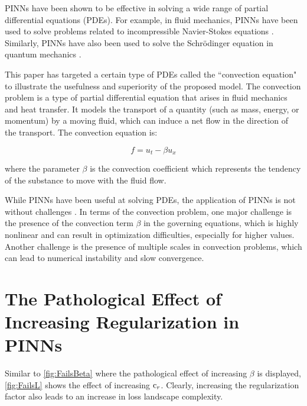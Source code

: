 \documentclass[letterpaper]{article} %
\begin{document}
        PINNs have been shown to be effective in solving a wide range of partial differential equations (PDEs). For example, in fluid mechanics, PINNs have been used to solve problems related to incompressible Navier-Stokes equations \cite{JIN2021109951}. Similarly, PINNs have also been used to solve the Schrödinger equation in quantum mechanics \cite{li2022mix}.

        This paper has targeted a certain type of PDEs called the ``convection equation" to illustrate the usefulness and superiority of the proposed model. The convection problem is a type of partial differential equation that arises in fluid mechanics and heat transfer. It models the transport of a quantity (such as mass, energy, or momentum) by a moving fluid, which can induce a net flow in the direction of the transport. The convection equation is:
        
        \begin{equation}
            f = u_t - \beta u_x
        \end{equation}

        where the parameter $\beta$ is the convection coefficient which represents the tendency of the substance to move with the fluid flow. 

        While PINNs have been useful at solving PDEs, the application of PINNs is not without challenges \cite{wang2020and,doi:10.1137/20M1318043}. In terms of the convection problem, one major challenge is the presence of the convection term $\beta$ in the governing equations, which is highly nonlinear and can result in optimization difficulties, especially for higher values. Another challenge is the presence of multiple scales in convection problems, which can lead to numerical instability and slow convergence. 


 
    \section{The Pathological Effect of Increasing Regularization in PINNs} \label{app:cres}

    Similar to \cref{fig:FailsBeta} where the pathological effect of increasing $\beta$ is displayed, \cref{fig:FailsL} shows the effect of increasing $\text{c}_{r}$. Clearly, increasing the regularization factor also leads to an increase in loss landscape complexity.  
    
\end{document}
